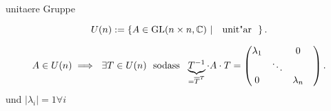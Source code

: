 \documentclass[class=article, crop=false]{standalone}
\begin{document}
\begin{zettel}{unitaere Gruppe}
\begin{flashcard}[]{}
	\[
		U (n) := \set{A \in  \GL(n \times n,\C )}{\tx{ unit"ar } }
	.\]
\end{flashcard}
\begin{corollary}
	\[
		A \in  U(n) \implies  \exists  T \in  U(n) \tx{ sodass } \underbrace{T^{-1}}_{ = \bar{T}^T} \cdot  A \cdot  T =
		\begin{pmatrix}
			\lambda_1 &        & 0           \\
			          & \ddots &           & \\
			0         &        & \lambda_n   \\
		\end{pmatrix}
	.\]
	und $ |\lambda_i| = 1 \forall i$
\end{corollary}
\end{zettel}
\end{document}
